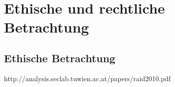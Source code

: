 \chapter{Ethische und rechtliche Betrachtung}  %
\label{cha:} %
\section{Ethische Betrachtung} %
\label{sec:} %
http://analysis.seclab.tuwien.ac.at/papers/raid2010.pdf

\subsection{} %
\label{sse:}
\subsubsection{} %
\label{sss:}
